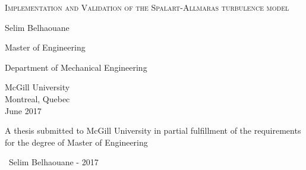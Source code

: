 \begin{titlepage}
	\centering
	\newcommand{\titlespace}{\vfill}
	{\Large \scshape
	Implementation and Validation of the Spalart-Allmaras turbulence model
	\par}
	\titlespace
	{\large Selim Belhaouane\par}
	\titlespace
	{\large Master of Engineering\par}
	\titlespace
	{\large Department of Mechanical Engineering\par}
	\titlespace
	{\large McGill University\\ Montreal, Quebec\\
	June 2017 \par}
	\titlespace
	{\large A thesis submitted to McGill University in partial fulfillment of the requirements for the degree of Master of Engineering\par}
	\vspace{0.25in}
	\vfill
	{\large \textcopyright \ Selim Belhaouane - 2017\par}

\end{titlepage}